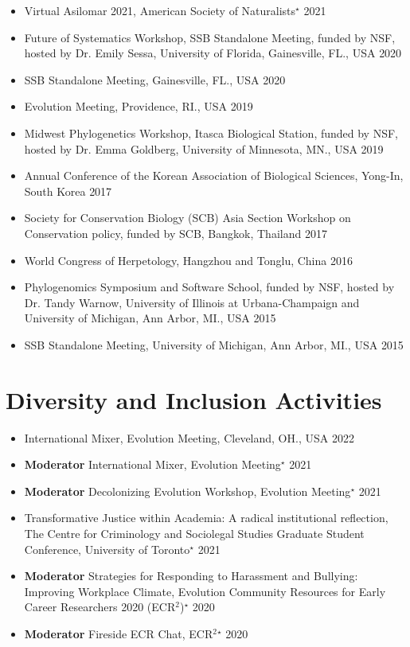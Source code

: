 \documentclass[11pt,letterpaper,sans]{moderncv} %
\begin{document}
\begin{itemize}
	\item Virtual Asilomar 2021, American Society of Naturalists$^\star$ \hfill{2021}	

	\item Future of Systematics Workshop, SSB Standalone Meeting, funded by NSF, hosted by Dr. Emily Sessa, University of Florida, Gainesville, FL., USA \hfill{2020}

	\item SSB Standalone Meeting, Gainesville, FL., USA \hfill{2020}

	\item Evolution Meeting, Providence, RI., USA \hfill{2019}

	\item Midwest Phylogenetics Workshop, Itasca Biological Station, funded by NSF, hosted by Dr. Emma Goldberg, University of Minnesota, MN., USA \hfill{2019}

	\item Annual Conference of the Korean Association of Biological Sciences, Yong-In, South Korea \hfill{2017}

	\item Society for Conservation Biology (SCB) Asia Section Workshop on Conservation policy, funded by SCB, Bangkok, Thailand \hfill{2017}

	\item World Congress of Herpetology, Hangzhou and Tonglu, China \hfill{2016}

	\item Phylogenomics Symposium and Software School, funded by NSF, hosted by Dr. Tandy Warnow, University of Illinois at Urbana-Champaign and University of Michigan, Ann Arbor, MI., USA \hfill{2015}
	
	\item SSB Standalone Meeting, University of Michigan, Ann Arbor, MI., USA \hfill{2015}\\
\end{itemize}

\section{Diversity and Inclusion Activities}
\begin{itemize}
	\item International Mixer, Evolution Meeting, Cleveland, OH., USA \hfill{2022}
	\item \textbf{Moderator} International Mixer, Evolution Meeting$^\star$ \hfill{2021}
	\item \textbf{Moderator} Decolonizing Evolution Workshop, Evolution Meeting$^\star$ \hfill{2021}
	\item Transformative Justice within Academia: A radical institutional reflection, The Centre for Criminology and Sociolegal Studies Graduate Student Conference, University of Toronto$^\star$ \hfill{2021}
	\item \textbf{Moderator} Strategies for Responding to Harassment and Bullying: Improving Workplace Climate, Evolution Community Resources for Early Career Researchers 2020 (ECR$^2$)$^\star$ \hfill{2020}
	\item \textbf{Moderator} Fireside ECR Chat, ECR$^2$$^\star$ \hfill{2020}
\end{itemize}
\end{document}
